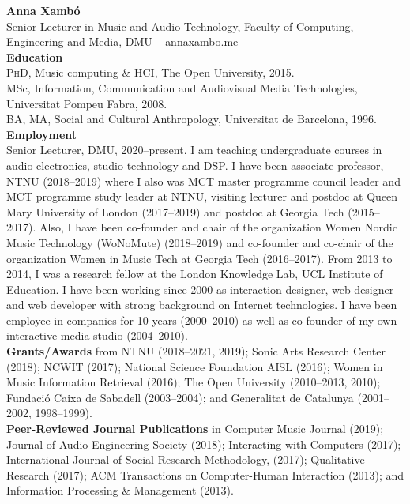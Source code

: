 \documentclass[10pt, a4paper]{article}
\begin{document}

{\textbf{Anna Xambó}}\\ 
Senior Lecturer in Music and Audio Technology, Faculty of Computing, Engineering and Media, DMU -- \href{http://annaxambo.me/}{annaxambo.me}\\

{\textbf{Education}}\\
\textsc{PhD}, Music computing \& HCI, The Open University, 2015.\\
MSc, Information, Communication and Audiovisual Media Technologies, Universitat Pompeu Fabra, 2008.\\
BA, MA, Social and Cultural Anthropology, Universitat de Barcelona, 1996.\\

{\textbf{Employment}}\\
Senior Lecturer, DMU, 2020--present. I am teaching undergraduate courses in audio electronics, studio technology and DSP. 
I have been associate professor, NTNU (2018--2019) where I also was MCT master programme council leader and MCT programme study leader at NTNU, visiting lecturer and postdoc at Queen Mary University of London (2017--2019) and postdoc at Georgia Tech (2015--2017). Also, I have been co-founder and chair of the organization Women Nordic Music Technology (WoNoMute) (2018--2019) and co-founder and co-chair of the organization Women in Music Tech at Georgia Tech (2016--2017). From 2013 to 2014, I was a research fellow at the London Knowledge Lab, UCL Institute of Education.
I have been working since 2000 as interaction designer, web designer and web developer with strong background on Internet technologies. I have been employee in companies for 10 years (2000--2010) as well as co-founder of my own interactive media studio (2004--2010).\\

{\textbf{Grants/Awards}} from NTNU (2018--2021, 2019); Sonic Arts Research Center (2018); NCWIT (2017); National Science Foundation AISL (2016); Women in Music Information Retrieval (2016); The Open University (2010--2013, 2010); Fundació Caixa de Sabadell (2003--2004); and Generalitat de Catalunya (2001--2002, 1998--1999).\\

{\textbf{Peer-Reviewed Journal Publications}} in Computer Music Journal (2019); Journal of Audio Engineering Society (2018); Interacting with Computers (2017); International Journal of Social Research Methodology, (2017); Qualitative Research (2017); ACM Transactions on Computer-Human Interaction (2013); and Information Processing \& Management (2013).\\
\end{document}
